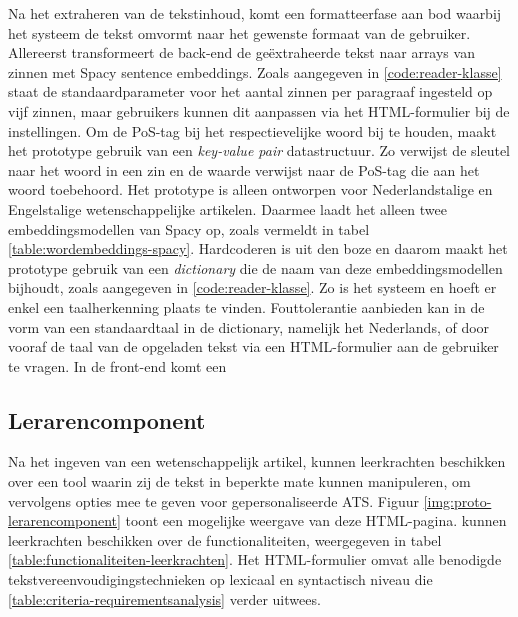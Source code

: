 Na het extraheren van de tekstinhoud, komt een formatteerfase aan bod waarbij het systeem de tekst omvormt naar het gewenste formaat van de gebruiker. Allereerst transformeert de back-end de geëxtraheerde tekst naar arrays van zinnen met Spacy sentence embeddings. Zoals aangegeven in \ref{code:reader-klasse} staat de standaardparameter voor het aantal zinnen per paragraaf ingesteld op vijf zinnen, maar gebruikers kunnen dit aanpassen via het HTML-formulier bij de instellingen. Om de PoS-tag bij het respectievelijke woord bij te houden, maakt het prototype gebruik van een \textit{key-value pair} datastructuur. Zo verwijst de sleutel naar het woord in een zin en de waarde verwijst naar de PoS-tag die aan het woord toebehoord. Het prototype is alleen ontworpen voor Nederlandstalige en Engelstalige wetenschappelijke artikelen. Daarmee laadt het alleen twee embeddingsmodellen van Spacy op, zoals vermeldt in tabel \ref{table:wordembeddings-spacy}. Hardcoderen is uit den boze en daarom maakt het prototype gebruik van een \textit{dictionary} die de naam van deze embeddingsmodellen bijhoudt, zoals aangegeven in \ref{code:reader-klasse}. Zo is het systeem en hoeft er enkel een taalherkenning plaats te vinden. Fouttolerantie aanbieden kan in de vorm van een standaardtaal in de dictionary, namelijk het Nederlands, of door vooraf de taal van de opgeladen tekst via een HTML-formulier aan de gebruiker te vragen. In de front-end komt een 

\subsection{Lerarencomponent}

Na het ingeven van een wetenschappelijk artikel, kunnen leerkrachten beschikken over een tool waarin zij de tekst in beperkte mate kunnen manipuleren, om vervolgens opties mee te geven voor gepersonaliseerde ATS. Figuur \ref{img:proto-lerarencomponent} toont een mogelijke weergave van deze HTML-pagina. kunnen leerkrachten beschikken over de functionaliteiten, weergegeven in tabel \ref{table:functionaliteiten-leerkrachten}. Het HTML-formulier omvat alle benodigde tekstvereenvoudigingstechnieken op lexicaal en syntactisch niveau die \ref{table:criteria-requirementsanalysis} verder uitwees. 

